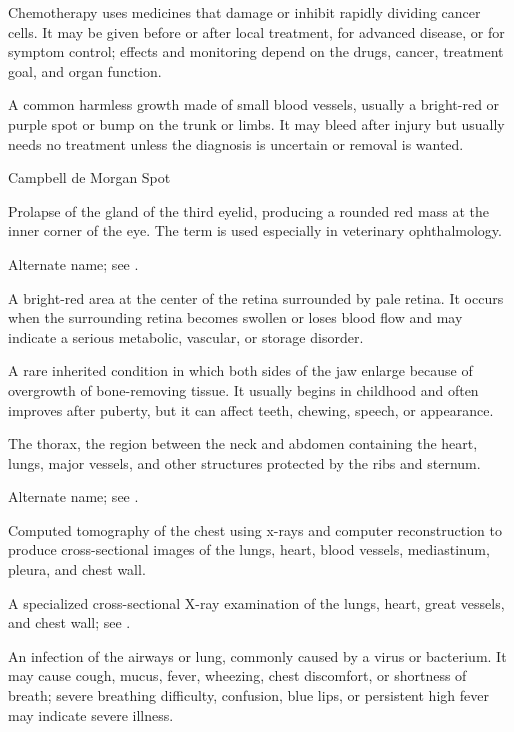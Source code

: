  Chemotherapy uses medicines that damage or inhibit rapidly dividing cancer cells. It may be given before or after local treatment, for advanced disease, or for symptom control; effects and monitoring depend on the drugs, cancer, treatment goal, and organ function.

 A common harmless growth made of small blood vessels, usually a bright-red or purple spot or bump on the trunk or limbs. It may bleed after injury but usually needs no treatment unless the diagnosis is uncertain or removal is wanted.

\synonyms
Campbell de Morgan Spot

 Prolapse of the gland of the third eyelid, producing a rounded red mass at the inner
corner of the eye. The term is used especially in veterinary ophthalmology.

 Alternate name; see .

 A bright-red area at the center of the retina surrounded by pale retina. It occurs when the surrounding retina becomes swollen or loses blood flow and may indicate a serious metabolic, vascular, or storage disorder.

 A rare inherited condition in which both sides of the jaw enlarge because of overgrowth of bone-removing tissue. It usually begins in childhood and often improves after puberty, but it can affect teeth, chewing, speech, or appearance.

 The thorax, the region between the neck and abdomen containing the heart, lungs, major vessels, and other structures protected by the ribs and sternum.

 Alternate name; see .

 Computed tomography of the chest using x-rays and computer reconstruction to produce cross-sectional images of the lungs, heart, blood vessels, mediastinum, pleura, and chest wall.

 A specialized cross-sectional X-ray examination of the lungs, heart, great vessels, and chest wall; see .

 An infection of the airways or lung, commonly caused by a virus or bacterium. It may cause cough, mucus, fever, wheezing, chest discomfort, or shortness of breath; severe breathing difficulty, confusion, blue lips, or persistent high fever may indicate severe illness.

